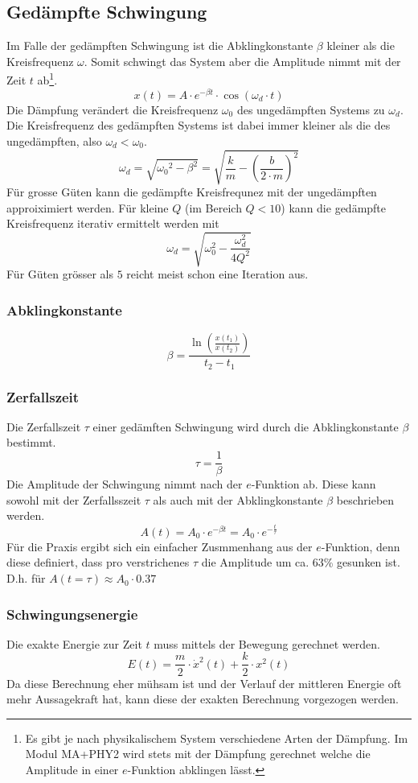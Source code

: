 \subsection{Gedämpfte Schwingung}
Im Falle der gedämpften Schwingung ist die Abklingkonstante $\beta$
kleiner als die Kreisfrequenz $\omega$. Somit schwingt das System
aber die Amplitude nimmt mit der Zeit $t$ ab\footnote{Es gibt je nach
physikalischem System verschiedene Arten der Dämpfung. Im Modul
MA+PHY2 wird stets mit der Dämpfung gerechnet welche die Amplitude
in einer $e$-Funktion abklingen lässt.}.
\[ \boxed{x(t) 
	= A \cdot e^{-\beta t} \cdot \cos(\omega_d \cdot t)
} \]
Die Dämpfung verändert die Kreisfrequenz $\omega_0$ des ungedämpften 
Systems zu $\omega_d$. Die Kreisfrequenz des gedämpften Systems ist
dabei immer kleiner als die des ungedämpften, also $\omega_d < \omega_0$.
\[ \boxed{\omega_d 
	= \sqrt{{\omega_0}^2 - \beta^2} 
	= \sqrt{\frac{k}{m} - \left({\frac{b}{2 \cdot m}}\right)^2}
} \]
Für grosse Güten kann die gedämpfte Kreisfrequnez mit der ungedämpften
approiximiert werden. Für kleine $Q$ (im Bereich $Q<10$) kann die
 gedämpfte Kreisfrequenz iterativ ermittelt werden mit
\[ \omega_d 
	=  \sqrt{\omega_0^2 - \frac{\omega_d^2}{4Q^2}}
\]
Für Güten grösser als $5$ reicht meist schon eine Iteration aus.

\subsubsection{Abklingkonstante}
\[ \boxed{\beta 
	= \frac{\ln\left(\frac{x(t_1)}{x(t_2)}\right)}{t_2 - t_1}
} \]

\subsubsection{Zerfallszeit}
Die Zerfallszeit $\tau$ einer gedämften Schwingung wird durch die 
Abklingkonstante $\beta$ bestimmt.
\[ \boxed{\tau 
	= \frac{1}{\beta}
} \]
Die Amplitude der Schwingung nimmt nach der $e$-Funktion ab. Diese kann
sowohl mit der Zerfallsszeit $\tau$ als auch mit der Abklingkonstante 
$\beta$ beschrieben werden.
\[ \boxed{A(t) 
	= A_0 \cdot e^{-\beta t} 
	= A_0 \cdot e^{-\frac{t}{\tau}}
} \]
Für die Praxis ergibt sich ein einfacher Zusmmenhang aus der $e$-Funktion,
denn diese definiert, dass pro verstrichenes $\tau$ die Amplitude um ca.
63\% gesunken ist. D.h. für $A(t=\tau) \approx A_0 \cdot 0.37$

\subsubsection{Schwingungsenergie}
Die exakte Energie zur Zeit $t$ muss mittels der Bewegung gerechnet werden.
\[ \boxed{E(t) 
	= \frac{m}{2} \cdot \dot{x}^2(t) + \frac{k}{2} \cdot x^2(t)
} \]
Da diese Berechnung eher mühsam ist und der Verlauf der mittleren Energie 
oft mehr Aussagekraft hat, kann diese der exakten Berechnung vorgezogen 
werden.

